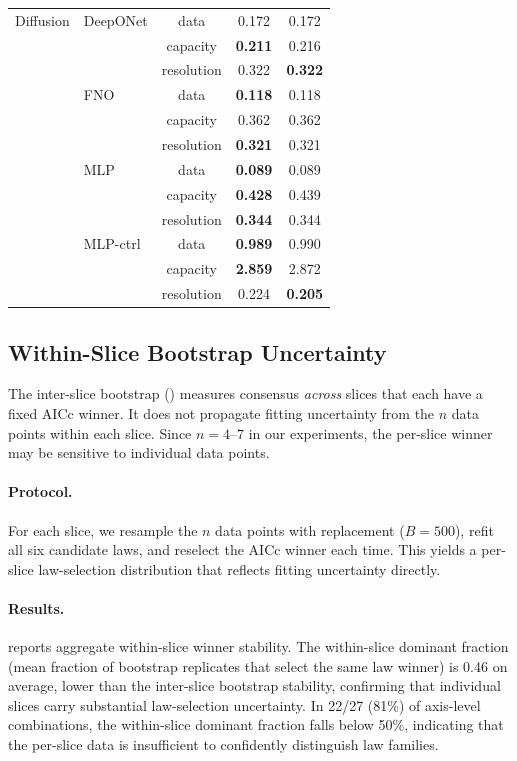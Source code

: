 \documentclass[11pt]{article}
\newcommand{\withinSliceMeanFrac}{0.46}
\newcommand{\withinSliceUnstableFrac}{22/27 (81\%)}
\begin{document}
\begin{table}[h]
\begin{tabular}{@{}llccc@{}}
Diffusion & DeepONet & data       & 0.172 & 0.172 \\
          &          & capacity   & \textbf{0.211} & 0.216 \\
          &          & resolution & 0.322 & \textbf{0.322} \\
          & FNO      & data       & \textbf{0.118} & 0.118 \\
          &          & capacity   & 0.362 & 0.362 \\
          &          & resolution & \textbf{0.321} & 0.321 \\
          & MLP      & data       & \textbf{0.089} & 0.089 \\
          &          & capacity   & \textbf{0.428} & 0.439 \\
          &          & resolution & \textbf{0.344} & 0.344 \\
          & MLP-ctrl & data       & \textbf{0.989} & 0.990 \\
          &          & capacity   & \textbf{2.859} & 2.872 \\
          &          & resolution & 0.224 & \textbf{0.205} \\
\bottomrule
\end{tabular}
\end{table}


\subsection{Within-Slice Bootstrap Uncertainty}
\label{sec:within-slice-bootstrap}

The inter-slice bootstrap () measures consensus
\emph{across} slices that each have a fixed AICc winner. It does
not propagate fitting uncertainty from the $n$ data points within
each slice. Since $n = 4$--$7$ in our experiments, the per-slice
winner may be sensitive to individual data points.

\paragraph{Protocol.}
For each slice, we resample the $n$ data points with replacement
($B = 500$), refit all six candidate laws, and reselect the AICc
winner each time. This yields a per-slice law-selection distribution
that reflects fitting uncertainty directly.

\paragraph{Results.}
 reports aggregate within-slice winner
stability. The within-slice dominant fraction (mean fraction of
bootstrap replicates that select the same law winner) is
\withinSliceMeanFrac{} on average, lower than the inter-slice
bootstrap stability, confirming that individual slices carry
substantial law-selection uncertainty. In
\withinSliceUnstableFrac{} of axis-level combinations, the
within-slice dominant fraction falls below 50\%, indicating that
the per-slice data is insufficient to confidently distinguish
law families.
\end{document}
